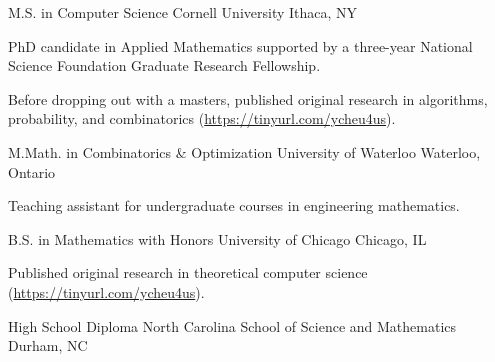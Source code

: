 

\begin{cventries}

  \cventry
    {M.S. in Computer Science} %
    {Cornell University} %
    {Ithaca, NY} %
    {} %
    {
      \begin{cvitems} %
        \item {PhD candidate in Applied Mathematics supported by a three-year National Science Foundation Graduate Research Fellowship.}
        \item {Before dropping out with a masters, published original research in algorithms, probability, and combinatorics (\url{https://tinyurl.com/ycheu4us}).}
      \end{cvitems}
    }

  \cventry
    {M.Math. in Combinatorics \& Optimization} %
    {University of Waterloo} %
    {Waterloo, Ontario} %
    {} %
    {
      \begin{cvitems} %
        \item {Teaching assistant for undergraduate courses in engineering mathematics.}
      \end{cvitems}
    }

  \cventry
    {B.S. in Mathematics with Honors} %
    {University of Chicago} %
    {Chicago, IL} %
    {} %
    {
      \begin{cvitems} %
        \item {Published original research in theoretical computer science (\url{https://tinyurl.com/ycheu4us}).}
      \end{cvitems}
    }

  \cventry
    {High School Diploma} %
    {North Carolina School of Science and Mathematics} %
    {Durham, NC} %
    {} %
    {}

\end{cventries}
